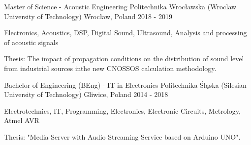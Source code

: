 
\begin{cventries}

  \cventry
  {Master of Science - Acoustic Engineering} %
  {Politechnika Wrocławska (Wroclaw University of Technology)} %
  {Wrocław, Poland} %
  {2018 - 2019} %
  {
    \begin{cvitems} %
      \item {Electronics, Acoustics, DSP, Digital Sound, Ultrasound, Analysis and processing of acoustic signals}
      \item {Thesis: The impact of propagation conditions on the distribution of sound level from industrial sources inthe new CNOSSOS calculation methodology.}
    \end{cvitems}
  }

  \cventry
  {Bachelor of Engineering (BEng) - IT in Electronics} %
  {Politechnika Śląska (Silesian University of Technology)} %
  {Gliwice, Poland} %
  {2014 - 2018} %
  {
    \begin{cvitems} %
      \item {Electrotechnics, IT, Programming, Electronics, Electronic Circuits, Metrology, Atmel AVR}
      \item {Thesis: "Media Server with Audio Streaming Service based on Arduino UNO".}

    \end{cvitems}
  }

\end{cventries}
